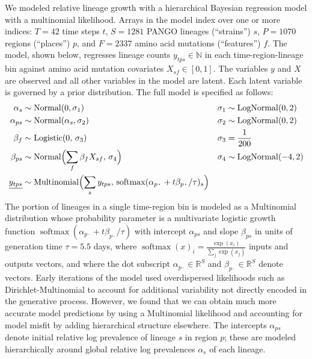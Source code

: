 \documentclass[12pt]{article}
\newcommand \blank {{\,\pmb\cdot\,}}
\begin{document}
We modeled relative lineage growth with a hierarchical Bayesian regression model with a multinomial likelihood.
Arrays in the model index over one or more indices: $T{=}42$ time steps $t$, $S{=}1281$ PANGO lineages (``strains'') $s$, $P{=}1070$ regions (``places'') $p$, and $F{=}2337$ amino acid mutations (``features'') $f$.
The model, shown below, regresses lineage counts $y_{tps}\in\mathbb N$ in each time-region-lineage bin against amino acid mutation covariates $X_{sf} \in [0,1]$.
The variables $y$ and $X$ are observed and all other variables in the model are latent. Each latent variable is governed by a prior distribution.
The full model is specified as follows:
\begin{align*}
  \textstyle
  \alpha_s &\sim \operatorname{Normal}(0, \sigma_1) &
  \sigma_1 &\sim \operatorname{LogNormal}(0, 2) \\
  \alpha_{ps} &\sim \operatorname{Normal}(\alpha_s, \sigma_2) &
  \sigma_2 &\sim \operatorname{LogNormal}(0, 2) \\
  \beta_f &\sim \operatorname{Logistic}(0,\, \sigma_3) &
  \sigma_3 &= \frac{1}{200} \\
  \beta_{ps} &\sim \operatorname{Normal}\Bigl(
   \sum_f \beta_f X_{sf},\, \sigma_4
  \Bigr) &
  \sigma_4 &\sim \operatorname{LogNormal}(-4, 2) \\
  \underline{y_{tps}} &\sim \operatorname{Multinomial}\Bigl(
    \sum_s y_{tps},\, \operatorname{softmax}(\alpha_{p\blank} + t\beta_{p\blank}/\tau)_s
  \Bigr)
\end{align*}
The portion of lineages in a single time-region bin is modeled as a Multinomial distribution whose probability parameter is a multivariate logistic growth function $\operatorname{softmax}(\alpha_{p\blank} + t\beta_{p\blank}/\tau)$ with intercept $\alpha_{ps}$ and slope $\beta_{ps}$ in units of generation time $\tau=5.5$ days, where
$
  \operatorname{softmax}(x)_i = \frac {\exp(x_i)} {\sum_j \exp(x_j)}
$
inputs and outputs vectors, and where the dot subscript $\alpha_{p\blank}\in\mathbb R^S$ and $\beta_{p\blank}\in\mathbb R^S$ denote vectors.
Early iterations of the model used overdispersed likelihoods such as Dirichlet-Multinomial to account for additional variability not directly encoded in the generative process.
However, we found that we can obtain much more accurate model predictions by using a Multinomial likelihood and accounting for model misfit by adding hierarchical structure elsewhere.
The intercepts $\alpha_{ps}$ denote initial relative log prevalence of lineage $s$ in region $p$; these are modeled hierarchically around global relative log prevalences $\alpha_s$ of each lineage.
\end{document}

